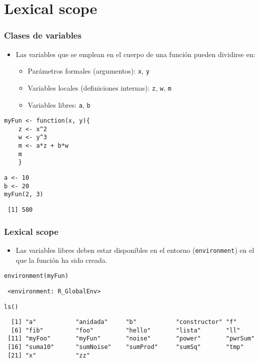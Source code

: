 \documentclass[xcolor={usenames,svgnames,dvipsnames}]{beamer}
\begin{document}
\section{Lexical scope}
\label{sec-2}
\begin{frame}[fragile]
\frametitle{Clases de variables}
\label{sec-2-1}

\begin{itemize}
\item Las variables que se emplean en el cuerpo de una función pueden
  dividirse en:
\begin{itemize}
\item Parámetros formales (argumentos): \texttt{x}, \texttt{y}
\item Variables locales (definiciones internas): \texttt{z}, \texttt{w}, \texttt{m}
\item Variables libres: \texttt{a}, \texttt{b}
\end{itemize}
\end{itemize}

\lstset{language=R}
\begin{lstlisting}
myFun <- function(x, y){
    z <- x^2
    w <- y^3
    m <- a*z + b*w
    m
    }
\end{lstlisting}



\lstset{language=R}
\begin{lstlisting}
a <- 10
b <- 20
myFun(2, 3)
\end{lstlisting}

\begin{verbatim}
 [1] 580
\end{verbatim}
\end{frame}
\begin{frame}[fragile]
\frametitle{Lexical scope}
\label{sec-2-2}


\begin{itemize}
\item Las variables libres deben estar disponibles en el entorno
  (\texttt{environment}) en el que la función ha sido creada.
\end{itemize}

\lstset{language=R}
\begin{lstlisting}
environment(myFun)
\end{lstlisting}

\begin{verbatim}
 <environment: R_GlobalEnv>
\end{verbatim}


\lstset{language=R}
\begin{lstlisting}
ls()
\end{lstlisting}

\begin{verbatim}
  [1] "a"           "anidada"     "b"           "constructor" "f"          
  [6] "fib"         "foo"         "hello"       "lista"       "ll"         
 [11] "myFoo"       "myFun"       "noise"       "power"       "pwrSum"     
 [16] "suma10"      "sumNoise"    "sumProd"     "sumSq"       "tmp"        
 [21] "x"           "zz"
\end{verbatim}
\end{frame}
\end{document}
